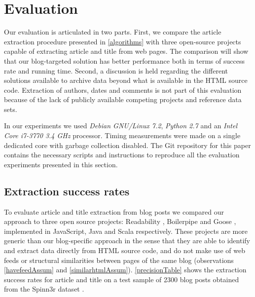 \section{Evaluation}

Our evaluation is articulated in two parts. First, we compare the article extraction procedure presented in \autoref{algorithms} with three open-source projects capable of extracting article and title from web pages. The comparison will show that our blog-targeted solution has better performance both in terms of success rate and running time. Second, a discussion is held regarding the different solutions available to archive data beyond what is available in the HTML source code. Extraction of authors, dates and comments is not part of this evaluation because of the lack of publicly available competing projects and reference data sets.

In our experiments we used \emph{Debian GNU/Linux 7.2}, \emph{Python 2.7} and an \emph{Intel Core i7-3770 3.4 GHz} processor. Timing measurements were made on a single dedicated core with garbage collection disabled. The Git repository for this paper \cite{repositoryofthispaper} contains the necessary scripts and instructions to reproduce all the evaluation experiments presented in this section.


\subsection{Extraction success rates}
To evaluate article and title extraction from blog posts we compared our approach to three open source projects: Readability \cite{python-readability2011}, Boilerpipe \cite{kohlschuetter2010} and Goose \cite{goose2012}, implemented in JavaScript, Java and Scala respectively. These projects are more generic than our blog-specific approach in the sense that they are able to identify and extract data directly from HTML source code, and do not make use of web feeds or structural similarities between pages of the same blog (observations \ref{havefeedAssum} and \ref{similarhtmlAssum}). \autoref{precisionTable} shows the extraction success rates for article and title on a test sample of 2300 blog posts obtained from the Spinn3r dataset \cite{burton2011}.


\precisionTable

